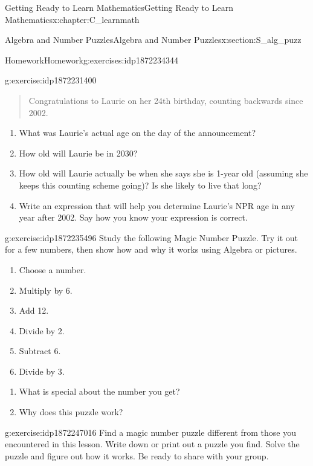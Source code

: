 \documentclass[oneside,10pt,]{book}
\numberwithin{equation}{chapter}
\begin{document}
\begin{chapterptx}{Getting Ready to Learn Mathematics}{}{Getting Ready to Learn Mathematics}{}{}{x:chapter:C_learnmath}
\begin{sectionptx}{Algebra and Number Puzzles}{}{Algebra and Number Puzzles}{}{}{x:section:S_alg_puzz}
\begin{exercises-subsection}{Homework}{}{Homework}{}{}{g:exercises:idp1872234344}
\begin{divisionexercise}{3}{}{}{g:exercise:idp1872231400}
\begin{quote}
Congratulations to Laurie on her 24th birthday, counting backwards since 2002.\end{quote}
%
\begin{enumerate}[font=\bfseries,label=(\alph*),ref=\alph*]
\item{}What was Laurie's actual age on the day of the announcement?%
\item{}How old will Laurie be in 2030?%
\item{}How old will Laurie actually be when she says she is 1-year old (assuming she keeps this counting scheme going)? Is she likely to live that long?%
\item{}Write an expression that will help you determine Laurie's NPR age in any year after 2002. Say how you know your expression is correct.%
\end{enumerate}
\end{divisionexercise}%
\begin{divisionexercise}{4}{}{}{g:exercise:idp1872235496}%
Study the following Magic Number Puzzle. Try it out for a few numbers, then show how and why it works using Algebra or pictures.%
\begin{enumerate}[label=(\alph*)]
\item{}Choose a number.%
\item{}Multiply by 6.%
\item{}Add 12.%
\item{}Divide by 2.%
\item{}Subtract 6.%
\item{}Divide by 3.%
\end{enumerate}
%
\begin{enumerate}[font=\bfseries,label=(\alph*),ref=\alph*]
\item{}What is special about the number you get?%
\item{}Why does this puzzle work?%
\end{enumerate}
\end{divisionexercise}%
\begin{divisionexercise}{5}{}{}{g:exercise:idp1872247016}%
Find a magic number puzzle different from those you encountered in this lesson. Write down or print out a puzzle you find. Solve the puzzle and figure out how it works. Be ready to share with your group.%
\end{divisionexercise}%
\end{exercises-subsection}
\end{sectionptx}
\end{chapterptx}
%
%
\typeout{************************************************}
\end{document}
